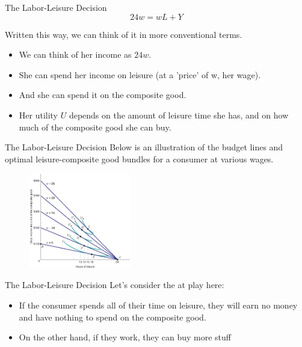 \documentclass[12pt,t]{beamer}
\begin{document}
\begin{frame}{The Labor-Leisure Decision}
  $$
    24w = wL + Y
  $$

  Written this way, we can think of it in more conventional terms.
  \bigskip
  \begin{itemize}
    \item We can think of her income as $24w$.

    \item She can spend her income on leisure (at a 'price' of w, her wage).

    \item And she can spend it on the composite good.

    \item Her utility $U$ depends on the amount of leisure time she has, and on how much of the composite good she can buy.
  \end{itemize}
\end{frame}

\begin{frame}{The Labor-Leisure Decision}
  Below is an illustration of the budget lines and optimal leisure-composite good bundles for a consumer at various wages.

  \begin{figure}
    \includegraphics[width=170px]{figures/fig5_24.jpg}
  \end{figure}
\end{frame}

\begin{frame}{The Labor-Leisure Decision}
  Let's consider the  at play here:
  
  \begin{itemize}
    \item If the consumer spends all of their time on leisure, they will earn no money and have nothing to spend on the composite good.

    \item On the other hand, if they work, they can buy more stuff
  \end{itemize}
\end{frame}
\end{document}
